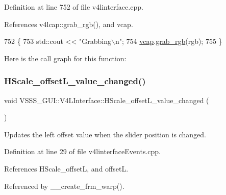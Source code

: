 Definition at line 752 of file v4linterface.\+cpp.



References v4lcap\+::grab\+\_\+rgb(), and vcap.


\begin{DoxyCode}
752                                                   \{
753             std::cout << \textcolor{stringliteral}{"Grabbing\(\backslash\)n"};
754             \hyperlink{class_v_s_s_s___g_u_i_1_1_v4_l_interface_a7ece61f4ccc6d5321c445e60f34e7f33}{vcap}.\hyperlink{classv4lcap_a4ef7f2a17a32f5b89bf9ddce123a3b52}{grab\_rgb}(rgb);
755         \}
\end{DoxyCode}
Here is the call graph for this function\+:
\mbox{\label{class_v_s_s_s___g_u_i_1_1_v4_l_interface_a52c94944c17c9ceaba03dd8f2f1849bf}} 
\subsubsection{\texorpdfstring{H\+Scale\+\_\+offset\+L\+\_\+value\+\_\+changed()}{HScale\_offsetL\_value\_changed()}}
{\footnotesize\ttfamily void V\+S\+S\+S\+\_\+\+G\+U\+I\+::\+V4\+L\+Interface\+::\+H\+Scale\+\_\+offset\+L\+\_\+value\+\_\+changed (\begin{DoxyParamCaption}{ }\end{DoxyParamCaption})}



Updates the left offset value when the slider position is changed. 



Definition at line 29 of file v4linterface\+Events.\+cpp.



References H\+Scale\+\_\+offsetL, and offsetL.



Referenced by \+\_\+\+\_\+create\+\_\+frm\+\_\+warp().


